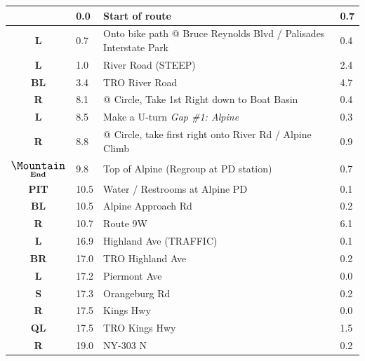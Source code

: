 \documentclass[11pt]{article}
\begin{document}
\renewcommand{\arraystretch}{1.15}
\twocolumn
{}
\tabletail{\hline}
\tablelasttail{\hline}
\begin{center}
  \begin{supertabular}{|c|p{0.30in}|p{2.25in}|l|}
  \hline
{} \textbf{} &   0.0 & Start of route &   0.7 \\ \hline
 \textbf{L} &   0.7 & Onto bike path @ Bruce Reynolds Blvd / Palisades Interstate Park &   0.4 \\ \hline
 \textbf{L} &   1.0 & River Road (STEEP) &   2.4 \\ \hline
 \textbf{BL} &   3.4 & TRO River Road &   4.7 \\ \hline
{} \textbf{R} &   8.1 & @ Circle, Take 1st Right down to Boat Basin &   0.4 \\ \hline
 \textbf{L} &   8.5 & Make a U-turn \newline \textit{Gap \#1: Alpine} &   0.3 \\ \hline
{} \textbf{R} &   8.8 & @ Circle, take first right onto River Rd / Alpine Climb &   0.9 \\ \hline
 $\underset{\textbf{End}}{\text{\large \Mountain}}$ &   9.8 & Top of Alpine (Regroup at PD station) &   0.7 \\ \hline
{} \textbf{PIT} &  10.5 & Water / Restrooms at Alpine PD &   0.1 \\ \hline
 \textbf{BL} &  10.5 & Alpine Approach Rd &   0.2 \\ \hline
{} \textbf{R} &  10.7 & Route 9W &   6.1 \\ \hline
 \textbf{L} &  16.9 & Highland Ave (TRAFFIC) &   0.1 \\ \hline
{} \textbf{BR} &  17.0 & TRO Highland Ave &   0.2 \\ \hline
 \textbf{L} &  17.2 & Piermont Ave &   0.0 \\ \hline
 \textbf{S} &  17.3 & Orangeburg Rd &   0.2 \\ \hline
{} \textbf{R} &  17.5 & Kings Hwy &   0.0 \\ \hline
 \textbf{QL} &  17.5 & TRO Kings Hwy &   1.5 \\ \hline
{} \textbf{R} &  19.0 & NY-303 N &   0.2 \\ \hline

\end{supertabular}
\end{center}
\end{document}
